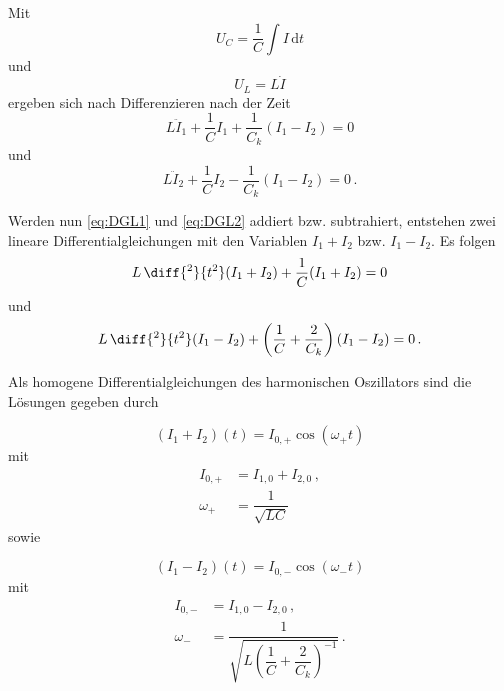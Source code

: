 Mit 
\begin{equation*}
    U_C = \dfrac{1}{C} \int I \, \text{d}t
\end{equation*}
und
\begin{equation*}
    U_L = L \dot{I}
\end{equation*}
ergeben sich nach Differenzieren nach der Zeit
\begin{equation}
    L\ddot{I}_1 + \dfrac{1}{C}I_1 + \dfrac{1}{C_k}(I_1 - I_2) = 0
    \label{eq:DGL1}
\end{equation}
und
\begin{equation}
    L\ddot{I}_2 + \dfrac{1}{C}I_2 - \dfrac{1}{C_k}(I_1 - I_2) = 0\,.
    \label{eq:DGL2}
\end{equation}

Werden nun \eqref{eq:DGL1} und \eqref{eq:DGL2} addiert bzw. subtrahiert, entstehen zwei lineare Differentialgleichungen mit den Variablen $I_1+I_2$ bzw. $I_1-I_2$.
Es folgen
\begin{equation}
    L \,\diff{^2}{t^2}(I_1+I_2) + \dfrac{1}{C}(I_1 + I_2) = 0
    \label{eq:addDGL}
\end{equation}
und
\begin{equation}
    L \,\diff{^2}{t^2}(I_1 - I_2) + \left(\dfrac{1}{C} + \dfrac{2}{C_k} \right)(I_1 - I_2) = 0\,.
\end{equation}

\newpage

Als homogene Differentialgleichungen des harmonischen Oszillators sind die Lösungen gegeben durch

\begin{equation}
    (I_1+I_2)(t) = I_{0,+} \cos(ω_+t)
    \label{eq:gleiSchwi}
\end{equation}
mit 
\begin{align}
    I_{0,+} &= I_{1,0}+I_{2,0}\, , \\
    ω_+     &=\dfrac{1}{\sqrt{LC}}
    \label{eq:w_+}
\end{align}
sowie

\begin{equation}
    (I_1-I_2)(t) = I_{0,-}\cos(ω_-t) 
    \label{eq:gegSchwi}
\end{equation}
mit 
\begin{align}
    I_{0,-} &=I_{1,0} - I_{2,0}\,, \nonumber \\
    ω_-     &= \dfrac{1}{\sqrt{L \left(\dfrac{1}{C}+\dfrac{2}{C_k}\right)^{-1}}}\,.
    \label{eq:w_-}
\end{align} \\

